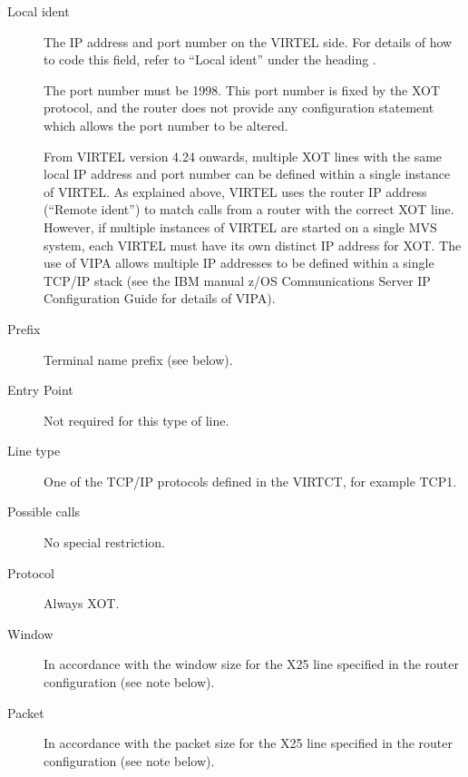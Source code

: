 \documentclass[letterpaper,10pt,english]{sphinxmanual}
\begin{document}
\begin{sphinxVerbatim}[commandchars=\\\{\}]
      
\end{sphinxVerbatim}
\begin{description}
\item[{Local ident}] \leavevmode
The IP address and port number on the VIRTEL side. For details of how to code this field, refer to “Local ident” under the heading {\hyperref[\detokenize{connectivity_guide:bookmark13}]{}}.

The port number must be 1998. This port number is fixed by the XOT protocol, and the router does not provide any configuration statement which allows the port number to be altered.

From VIRTEL version 4.24 onwards, multiple XOT lines with the same local IP address and port number can be defined within a single instance of VIRTEL. As explained above, VIRTEL uses the router IP address (“Remote ident”) to match calls from a router with the correct XOT line. However, if multiple instances of VIRTEL are started on a single MVS system, each VIRTEL must have its own distinct IP address for XOT. The use of VIPA allows multiple IP addresses to be defined within a single TCP/IP stack (see the IBM manual z/OS Communications Server IP Configuration Guide for details of VIPA).

\item[{Prefix}] \leavevmode
Terminal name prefix (see below).

\item[{Entry Point}] \leavevmode
Not required for this type of line.

\item[{Line type}] \leavevmode
One of the TCP/IP protocols defined in the VIRTCT, for example TCP1.

\item[{Possible calls}] \leavevmode
No special restriction.

\item[{Protocol}] \leavevmode
Always XOT.

\item[{Window}] \leavevmode
In accordance with the window size for the X25 line specified in the router configuration (see note below).

\item[{Packet}] \leavevmode
In accordance with the packet size for the X25 line specified in the router configuration (see note below).


\end{description}
\end{document}
